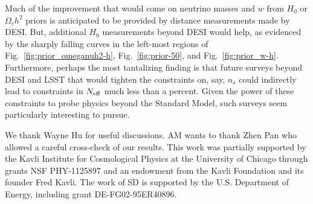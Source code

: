 \documentclass[aps,prd,reprint,superscriptaddress,nofootinbib,floatfix]{revtex4-1}
\newcommand{\reffig}[1]{Fig.~\ref{fig:#1}}
\begin{document}
Much of the improvement that would come on neutrino masses and $w$ from $H_0$ or $\Omega_ch^2$ priors is anticipated to be provided by distance measurements made by DESI. But, additional $H_0$ measurements beyond DESI would help, as evidenced by the sharply falling curves in the left-most regions of \reffig{prior_omeganuh2-h}, \reffig{prior-50}, and \reffig{prior_w-h}. Furthermore, perhaps the most tantalizing finding is that future surveys beyond DESI and LSST \cite{lsst-dark-energy-science-collaboration:2012} that would tighten the constraints on, say, $n_s$ could indirectly lead to constraints in $N_{\rm eff}$ much less than a percent. Given the power of these constraints to probe physics beyond the Standard Model, such surveys seem particularly interesting to pursue.

\begin{acknowledgments}
We thank Wayne Hu for useful discussions. AM wants to thank Zhen Pan who allowed a careful cross-check of our results.
This work was partially supported by the Kavli Institute for Cosmological Physics at the University of Chicago through grants NSF PHY-1125897 and an endowment from the Kavli Foundation and its founder Fred Kavli.
The work of SD is supported by the U.S. Department of Energy, including grant DE-FG02-95ER40896.
\end{acknowledgments}


\end{document}
